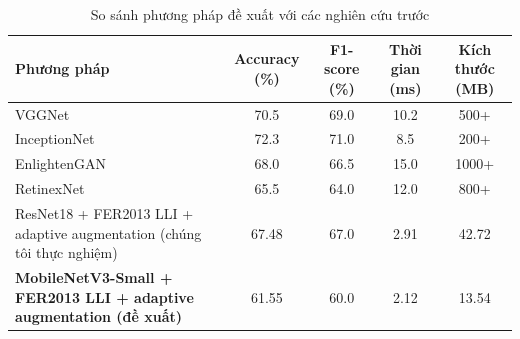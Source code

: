 \begin{table}[H]
\centering
\caption{So sánh phương pháp đề xuất với các nghiên cứu trước}
\label{tab:compare_sota}
\begin{tabular}{@{}>{\raggedright\arraybackslash}p{5cm}cccc@{}}
\toprule
\textbf{Phương pháp} & \textbf{Accuracy (\%)} & \textbf{F1-score (\%)} & \textbf{Thời gian (ms)} & \textbf{Kích thước (MB)} \\ \midrule
VGGNet~\cite{goodfellow2014} & 70.5 & 69.0 & 10.2 & 500+ \\
InceptionNet~\cite{goodfellow2014} & 72.3 & 71.0 & 8.5 & 200+ \\
EnlightenGAN~\cite{zhang2019b} & 68.0 & 66.5 & 15.0 & 1000+ \\
RetinexNet~\cite{wang2022} & 65.5 & 64.0 & 12.0 & 800+ \\
ResNet18 + FER2013 LLI + adaptive augmentation (chúng tôi thực nghiệm) & 67.48 & 67.0 & 2.91 & 42.72 \\
\textbf{MobileNetV3-Small + FER2013 LLI + adaptive augmentation (đề xuất)} & 61.55 & 60.0 & 2.12 & 13.54 \\ \bottomrule
\end{tabular}
\end{table}

